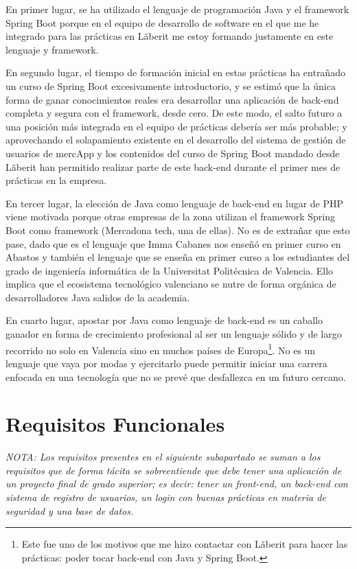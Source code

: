 \documentclass[a4paper,12pt]{report}
\begin{document}
		En primer lugar, se ha utilizado el lenguaje de programación Java y el framework Spring Boot porque en el equipo de desarrollo de software en el que me he integrado para las prácticas en Lãberit me estoy formando justamente en este lenguaje y framework. 
		
		En segundo lugar, el tiempo de formación inicial en estas prácticas ha entrañado un curso de Spring Boot excesivamente introductorio, y se estimó que la única forma de ganar conocimientos reales era desarrollar una aplicación de back-end completa y segura con el framework, desde cero. De este modo, el salto futuro a una posición más integrada en el equipo de prácticas debería ser más probable; y aprovechando el solapamiento existente en el desarrollo del sistema de gestión de usuarios de mercApp y los contenidos del curso de Spring Boot mandado desde Lãberit han permitido realizar parte de este back-end durante el primer mes de prácticas en la empresa.
			
		En tercer lugar, la elección de Java como lenguaje de back-end en lugar de PHP viene motivada porque otras empresas de la zona utilizan el framework Spring Boot como framework (Mercadona tech, una de ellas). No es de extrañar que esto pase, dado que es el lenguaje que Imma Cabanes nos enseñó en primer curso en Abastos y también el lenguaje que se enseña en primer curso a los estudiantes del grado de ingeniería informática de la Universitat Politécnica de Valencia. Ello implica que el ecosistema tecnológico valenciano se nutre de forma orgánica de desarrolladores Java salidos de la academia.
		
		En cuarto lugar, apostar por Java como lenguaje de back-end es un caballo ganador en forma de crecimiento profesional al ser un lenguaje sólido y de largo recorrido no solo en Valencia sino en muchos países de Europa\footnote{Este fue uno de los motivos que me hizo contactar con Lãberit para hacer las prácticas: poder tocar back-end con Java y Spring Boot.}. No es un lenguaje que vaya por modas y ejercitarlo puede permitir iniciar una carrera enfocada en una tecnología que no se prevé que desfallezca en un futuro cercano.
		
		
		
		
		\section{Requisitos Funcionales}
		
			\textit{NOTA: Los requisitos presentes en el siguiente subapartado se suman a los requisitos que de forma tácita se sobreentiende que debe tener una aplicación de un proyecto final de grado superior; es decir: tener un front-end, un back-end con sistema de registro de usuarios, un login con buenas prácticas en materia de seguridad y una base de datos.}
		
\end{document}
